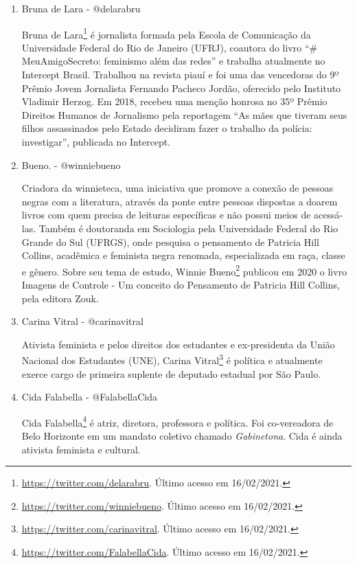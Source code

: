 \documentclass[
	12pt,				%
	openright,			%
	twoside,			%
	a4paper,			%
	english,			%
	brazil				%
	]{abntex2}
\begin{document}
\begin{anexosenv}
\begin{enumerate}
 \item Bruna de Lara - @delarabru
 
 Bruna de Lara\footnote{\url{https://twitter.com/delarabru}. Último acesso em 16/02/2021.} é jornalista formada pela Escola de Comunicação da Universidade Federal do Rio de Janeiro (UFRJ), coautora do livro ``$\#$MeuAmigoSecreto: feminismo além das redes'' e trabalha atualmente no Intercept Brasil. Trabalhou na revista piauí e foi uma das vencedoras do 9º Prêmio Jovem Jornalista Fernando Pacheco Jordão, oferecido pelo Instituto Vladimir Herzog. Em 2018, recebeu uma menção honrosa no 35º Prêmio Direitos Humanos de Jornalismo pela reportagem ``As mães que tiveram seus filhos assassinados pelo Estado decidiram fazer o trabalho da polícia: investigar'', publicada no Intercept.
 
 \newpage

 \item Bueno. - @winniebueno
 
 Criadora da winnieteca, uma iniciativa que promove a conexão de pessoas negras com a literatura, através da ponte entre pessoas dispostas a doarem livros com quem precisa de leituras específicas e não possui meios de acessá-las. Também é doutoranda em Sociologia pela Universidade Federal do Rio Grande do Sul (UFRGS), onde pesquisa o pensamento de Patricia Hill Collins, acadêmica e feminista negra renomada, especializada em raça, classe e gênero. Sobre seu tema de estudo, Winnie Bueno\footnote{\url{https://twitter.com/winniebueno}. Último acesso em 16/02/2021.} publicou em 2020 o livro Imagens de Controle - Um conceito do Pensamento de Patricia Hill Collins, pela editora Zouk.

 \item Carina Vitral - @carinavitral
 
 Ativista feminista e pelos direitos dos estudantes e ex-presidenta da União Nacional dos Estudantes (UNE), Carina Vitral\footnote{\url{https://twitter.com/carinavitral}. Último acesso em 16/02/2021.} é política e atualmente exerce cargo de primeira suplente de deputado estadual por São Paulo.

 \item Cida Falabella - @FalabellaCida
 
 Cida Falabella\footnote{\url{https://twitter.com/FalabellaCida}. Último acesso em 16/02/2021.} é atriz, diretora, professora e política. Foi co-vereadora de Belo Horizonte em um mandato coletivo chamado \textit{Gabinetona}. Cida é ainda ativista feminista e cultural.


\end{enumerate}
\end{anexosenv}
\end{document}
